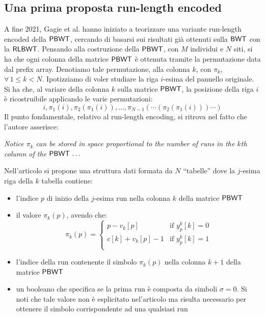 \subsection{Una prima proposta run-length encoded}
\label{subsectravis}
A fine 2021, Gagie et al. \cite{tricks} hanno iniziato a teorizzare una variante
run-length encoded della $\mbox{\rm {\sf PBWT}}$, cercando di basarsi sui risultati
già ottenuti sulla $\mbox{\rm {\sf BWT}}$ con la $\mbox{\rm {\sf RLBWT}}$.
Pensando alla costruzione della $\mbox{\rm {\sf PBWT}}$, con $M$ individui e $N$ siti, si
ha che ogni colonna della 
matrice $\mbox{\rm {\sf PBWT}}$ è ottenuta tramite la permutazione data dal prefix
  array. Denotiamo tale permutazione, alla colonna $k$, con $\pi_k$, $\forall\,
1\leq k<N$. 
Ipotizziamo di voler studiare la riga $i$-esima del pannello originale. Si
ha che, al variare della colonna $k$ sulla matrice $\mbox{\rm {\sf PBWT}}$, la posizione
della riga $i$ è ricostruibile applicando le varie permutazioni:
\begin{equation}
  \label{eq:pbwttrick}
  i, \pi_1(i), \pi_2(\pi_1(i)),\ldots,
  \pi_{N-1}(\cdots(\pi_2(\pi_1(i)))\cdots)
\end{equation}
Il punto fondamentale, relativo al run-length encoding, si ritrova nel fatto che
l'autore asserisce: 
\begin{center}
  \textit{Notice $\pi_k$ can be stored in space proportional to the number of
    runs in the $k$th column of the $\mbox{\rm {\sf PBWT}}\,\ldots$} 
\end{center}
Nell'articolo si propone una struttura dati formata da $N$ ``tabelle''
dove la $j$-esima riga della $k$ tabella contiene: 
\begin{itemize}
  \item l'indice $p$ di inizio della $j$-esima run nella colonna $k$ della
   matrice $\mbox{\rm {\sf PBWT}}$
  \item il valore $\pi_k(p)$, avendo che:
  \begin{equation}
    \label{eq:pbwttrick1}
    \pi_k(p)=
    \begin{cases}
      p-v_k[p]&\mbox{if } y_p^k[k]=0\\
      c[k]+v_k[p]-1&\mbox{if } y_p^k[k]=1\\
    \end{cases}
  \end{equation}
  \item l'indice della run contenente il simbolo $\pi_k(p)$ nella colonna $k+1$
  della matrice $\mbox{\rm {\sf PBWT}}$
  \item un booleano che specifica se la prima run è composta da simboli
  $\sigma=0$. Si noti che tale valore non è esplicitato nel'articolo ma
  risulta necessario per ottenere il simbolo corrispondente ad una qualsiasi run
\end{itemize}

